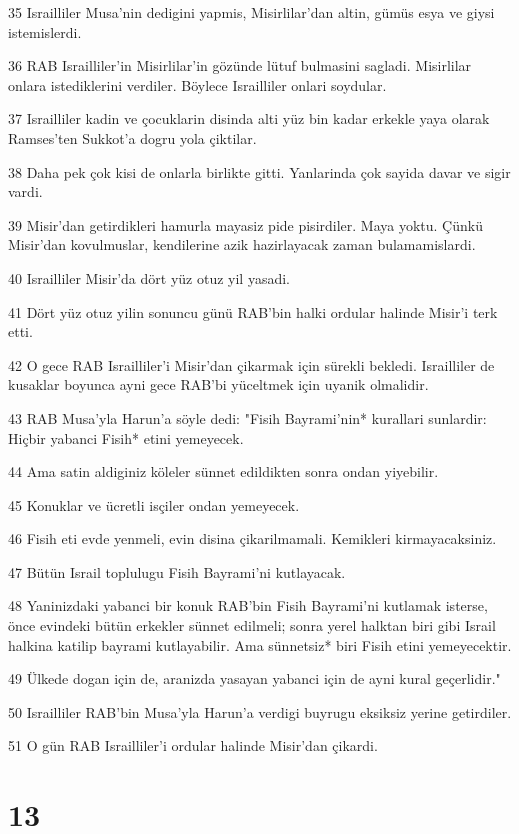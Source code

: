 \par 35 Israilliler Musa'nin dedigini yapmis, Misirlilar'dan altin, gümüs esya ve giysi istemislerdi.
\par 36 RAB Israilliler'in Misirlilar'in gözünde lütuf bulmasini sagladi. Misirlilar onlara istediklerini verdiler. Böylece Israilliler onlari soydular.
\par 37 Israilliler kadin ve çocuklarin disinda alti yüz bin kadar erkekle yaya olarak Ramses'ten Sukkot'a dogru yola çiktilar.
\par 38 Daha pek çok kisi de onlarla birlikte gitti. Yanlarinda çok sayida davar ve sigir vardi.
\par 39 Misir'dan getirdikleri hamurla mayasiz pide pisirdiler. Maya yoktu. Çünkü Misir'dan kovulmuslar, kendilerine azik hazirlayacak zaman bulamamislardi.
\par 40 Israilliler Misir'da dört yüz otuz yil yasadi.
\par 41 Dört yüz otuz yilin sonuncu günü RAB'bin halki ordular halinde Misir'i terk etti.
\par 42 O gece RAB Israilliler'i Misir'dan çikarmak için sürekli bekledi. Israilliler de kusaklar boyunca ayni gece RAB'bi yüceltmek için uyanik olmalidir.
\par 43 RAB Musa'yla Harun'a söyle dedi: "Fisih Bayrami'nin* kurallari sunlardir: Hiçbir yabanci Fisih* etini yemeyecek.
\par 44 Ama satin aldiginiz köleler sünnet edildikten sonra ondan yiyebilir.
\par 45 Konuklar ve ücretli isçiler ondan yemeyecek.
\par 46 Fisih eti evde yenmeli, evin disina çikarilmamali. Kemikleri kirmayacaksiniz.
\par 47 Bütün Israil toplulugu Fisih Bayrami'ni kutlayacak.
\par 48 Yaninizdaki yabanci bir konuk RAB'bin Fisih Bayrami'ni kutlamak isterse, önce evindeki bütün erkekler sünnet edilmeli; sonra yerel halktan biri gibi Israil halkina katilip bayrami kutlayabilir. Ama sünnetsiz* biri Fisih etini yemeyecektir.
\par 49 Ülkede dogan için de, aranizda yasayan yabanci için de ayni kural geçerlidir."
\par 50 Israilliler RAB'bin Musa'yla Harun'a verdigi buyrugu eksiksiz yerine getirdiler.
\par 51 O gün RAB Israilliler'i ordular halinde Misir'dan çikardi.

\chapter{13}

